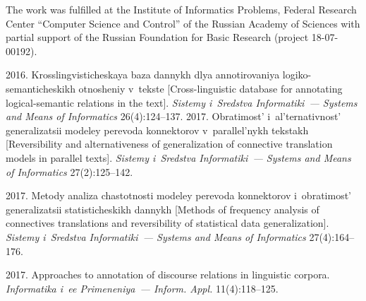     
    


\Ack
\noindent
The work was fulfilled at the 
Institute of Informatics Problems, Federal Research Center ``Computer Science 
and Control'' of the Russian Academy of Sciences with partial support of the Russian
Foundation for Basic Research (project  18-07-00192).





  \begin{multicols}{2}

\renewcommand{\bibname}{\protect\rmfamily References}

{\small\frenchspacing
 {%
 \begin{thebibliography}{99}
 
   2016.  
Krosslingvisticheskaya baza dannykh dlya annotirovaniya logiko-semanticheskikh 
otnosheniy v~tekste [Cross-linguistic database for annotating logical-semantic 
relations in the text]. \textit{Sistemy i~Sredstva Informatiki~--- Systems and Means of 
Informatics} 26(4):124--137.
   2017. Obratimost' 
i~al'ternativnost' generalizatsii modeley pe\-re\-vo\-da konnektorov v~parallel'nykh 
tekstakh [Reversibility and alternativeness of generalization of connective translation 
models in parallel texts]. \textit{Sistemy i~Sredstva Informatiki~--- Systems and 
Means of Informatics} 27(2):125--142.
 
   2017. Metody analiza 
chastotnosti modeley perevoda konnektorov i~obratimost' generalizatsii 
statisticheskikh dannykh [Methods of frequency analysis of connectives translations 
and reversibility of statistical data generalization]. \textit{Sistemy i~Sredstva 
Informatiki~--- Systems and Means of Informatics} 27(4):164--176.

   2017. Approaches to annotation of discourse relations in linguistic 
corpora. \textit{Informatika i~ee Primeneniya~--- Inform. Appl.} 11(4):118--125.
 

\end{thebibliography}}}
\end{multicols}
